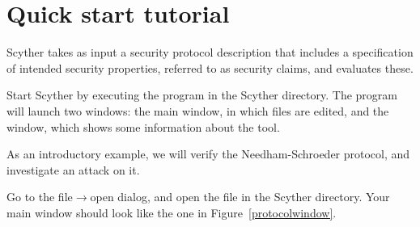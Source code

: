 \documentclass{book}
\begin{document}




\chapter{Quick start tutorial}
\label{sec:tutorial}

Scyther takes as input a security protocol description that includes a
specification of intended security properties, referred to as security
claims, and evaluates these. 

Start Scyther by executing the  program in the
Scyther directory. The program will launch two windows: the main window,
in which files are edited, and the  window, which shows some
information about the tool. 

As an introductory example, we will verify the Needham-Schroeder
protocol, and investigate an attack on it. 

Go to the file$\rightarrow$open dialog, and open the file
 in the Scyther directory. Your main window should look
like the one in Figure~\ref{protocolwindow}.
\end{document}
